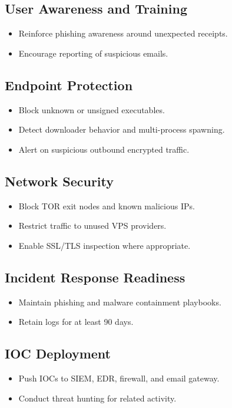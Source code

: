 \documentclass[12pt]{article}
\begin{document}
\subsection{User Awareness and Training}
\begin{itemize}
    \item Reinforce phishing awareness around unexpected receipts.
    \item Encourage reporting of suspicious emails.
\end{itemize}

\subsection{Endpoint Protection}
\begin{itemize}
    \item Block unknown or unsigned executables.
    \item Detect downloader behavior and multi-process spawning.
    \item Alert on suspicious outbound encrypted traffic.
\end{itemize}

\subsection{Network Security}
\begin{itemize}
    \item Block TOR exit nodes and known malicious IPs.
    \item Restrict traffic to unused VPS providers.
    \item Enable SSL/TLS inspection where appropriate.
\end{itemize}

\subsection{Incident Response Readiness}
\begin{itemize}
    \item Maintain phishing and malware containment playbooks.
    \item Retain logs for at least 90 days.
\end{itemize}

\subsection{IOC Deployment}
\begin{itemize}
    \item Push IOCs to SIEM, EDR, firewall, and email gateway.
    \item Conduct threat hunting for related activity.
\end{itemize}
\end{document}

